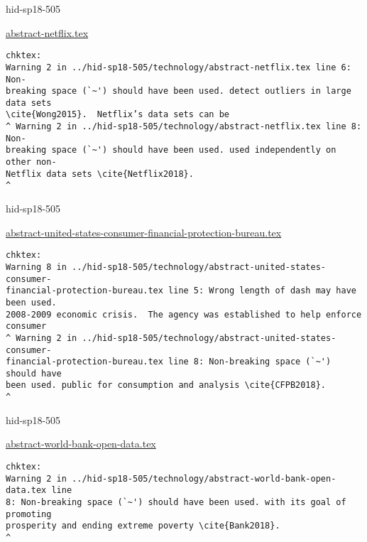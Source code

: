 

\begin{IU}

hid-sp18-505

\href{https://github.com/cloudmesh-community/hid-sp18-505/blob/master//technology/abstract-netflix.tex}{abstract-netflix.tex}

\begin{tiny}
\begin{verbatim}
chktex:
Warning 2 in ../hid-sp18-505/technology/abstract-netflix.tex line 6: Non-
breaking space (`~') should have been used. detect outliers in large data sets
\cite{Wong2015}.  Netflix’s data sets can be
^ Warning 2 in ../hid-sp18-505/technology/abstract-netflix.tex line 8: Non-
breaking space (`~') should have been used. used independently on other non-
Netflix data sets \cite{Netflix2018}.
^
\end{verbatim}
\end{tiny}
\end{IU}



\begin{IU}

hid-sp18-505

\href{https://github.com/cloudmesh-community/hid-sp18-505/blob/master//technology/abstract-united-states-consumer-financial-protection-bureau.tex}{abstract-united-states-consumer-financial-protection-bureau.tex}

\begin{tiny}
\begin{verbatim}
chktex:
Warning 8 in ../hid-sp18-505/technology/abstract-united-states-consumer-
financial-protection-bureau.tex line 5: Wrong length of dash may have been used.
2008-2009 economic crisis.  The agency was established to help enforce consumer
^ Warning 2 in ../hid-sp18-505/technology/abstract-united-states-consumer-
financial-protection-bureau.tex line 8: Non-breaking space (`~') should have
been used. public for consumption and analysis \cite{CFPB2018}.
^
\end{verbatim}
\end{tiny}
\end{IU}



\begin{IU}

hid-sp18-505

\href{https://github.com/cloudmesh-community/hid-sp18-505/blob/master//technology/abstract-world-bank-open-data.tex}{abstract-world-bank-open-data.tex}

\begin{tiny}
\begin{verbatim}
chktex:
Warning 2 in ../hid-sp18-505/technology/abstract-world-bank-open-data.tex line
8: Non-breaking space (`~') should have been used. with its goal of promoting
prosperity and ending extreme poverty \cite{Bank2018}.
^
\end{verbatim}
\end{tiny}
\end{IU}

